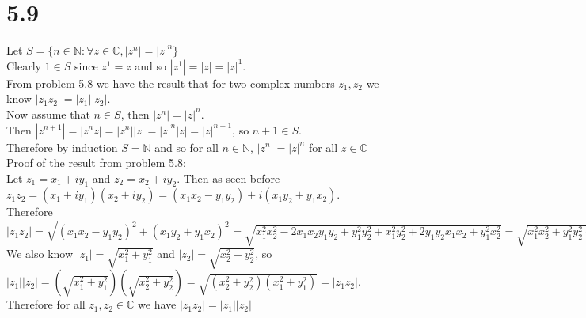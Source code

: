 \documentclass{article}
\begin{document}
\section*{5.9}
\begin{center}
    \doublespacing
    Let $S =\{n\in\mathbb{N}:\forall z\in\mathbb{C}, |z^n| = |z|^n\}$
    \\Clearly $1\in S$ since $z^1 = z$ and so $|z^1| = |z| = |z|^1$.
    \\From problem 5.8 we have the result that for two complex numbers $z_1, z_2$ we know $|z_1 z_2| = |z_1||z_2|$.
    \\Now assume that $n\in S$, then $|z^n| = |z|^n$.
    \\Then $|z^{n+1}| = |z^n z| = |z^n||z| = |z|^n |z| = |z|^{n+1}$, so $n+1\in S$.
    \\Therefore by induction $S =\mathbb{N}$ and so for all $n\in\mathbb{N}$, $|z^n| = |z|^n$ for all $z\in\mathbb{C}$ \qedsymbol
    \break
    \\Proof of the result from problem 5.8:
    \\Let $z_1 = x_1 + i y_1$ and $z_2 = x_2 + i y_2$. Then as seen before $z_1 z_2 = (x_1 + i y_1)(x_2 + i y_2) = (x_1 x_2 - y_1 y_2) + i(x_1 y_2 + y_1 x_2)$.
    \\Therefore $|z_1 z_2| =\sqrt{(x_1 x_2 - y_1 y_2)^2 + (x_1 y_2 + y_1 x_2)^2} =\sqrt{x_1^2 x_2^2 - 2 x_1 x_2 y_1 y_2 + y_1^2 y_2^2 + x_1^2 y_2^2 + 2 y_1 y_2 x_1 x_2 + y_1^2 x_2^2} =\sqrt{x_1^2 x_2^2 + y_1^2 y_2^2 + x_1^2 y_2^2 + y_1^2 x_2^2} =\sqrt{x_1^2 (x_2^2 + y_2^2) + y_1^2 y_2^2 + y_1^2 x_2^2} =\sqrt{x_1^2 (x_2^2 + y_2^2) + y_1^2 (y_2^2 + x_2^2)} =\sqrt{(x_2^2 + y_2^2)(x_1^2 + y_1^2)}$
    \\We also know $|z_1| =\sqrt{x_1^2 + y_1^2}$ and $|z_2| =\sqrt{x_2^2 + y_2^2}$, so $|z_1||z_2| =(\sqrt{x_1^2 + y_1^2})(\sqrt{x_2^2 + y_2^2}) =\sqrt{(x_2^2 + y_2^2)(x_1^2 + y_1^2)} = |z_1 z_2|$.
    \\Therefore for all $z_1, z_2\in\mathbb{C}$ we have $|z_1 z_2| = |z_1||z_2|$ \qedsymbol
\end{center}
\end{document}
